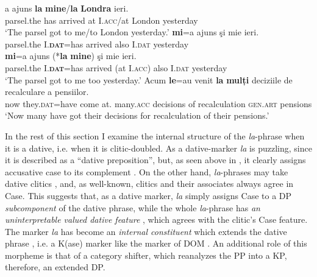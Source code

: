 \documentclass[output=paper,colorlinks,citecolor=brown,nonflat]{langsci/langscibook}
\begin{document}
\ea%
      \label{ex:cornilescu:11}
         \ea \label{ex:cornilescu:11a}
          {a} {ajuns} \textbf{{la}} \textbf{mine}/\textbf{la} \textbf{{Londra}} {ieri}.	\\
         	 parsel.the has arrived at I.\textsc{acc}/at London yesterday\\
         \glt ‘The parsel got to me/to London yesterday.’
         \ex \label{ex:cornilescu:11b}
          \textbf{{mi}}{=a} {ajuns} {şi} {mie} {ieri.}	\\
         	parsel.the I.\textbf{\textsc{dat}}=has arrived also I.\textsc{dat} yesterday\\
         \ex \label{ex:cornilescu:11c}
          \textbf{{mi}}{=a} {ajuns} (*\textbf{la} \textbf{mine}) {şi} {mie} {ieri}.	\\
         parsel.the I.\textbf{\textsc{dat}}=has arrived (at I.\textsc{acc}) also I.\textsc{dat} yesterday\\
         \glt ‘The parsel got to me too yesterday.’
         \ex \label{ex:cornilescu:11d}
         \gll Acum \textbf{{le}}{=au} {venit} \textbf{{la}} \textbf{{mulți}} {deciziile} {de} {recalculare} a pensiilor.\\
         	now they.\textsc{dat}=have come at. many.\textsc{acc} decisions of  recalculation \textsc{gen.art} pensions\\
         \glt ‘Now many have got their decisions for recalculation of their pensions.’
         \z
         \z

In the rest of this section I examine the internal structure of the \textit{la}{}-phrase when it is a dative, i.e. when it is clitic-doubled. As a dative-marker \textit{la} is puzzling, since it is described as a “dative preposition”, but, as seen above in , it clearly assigns accusative case to its complement . On the other hand, \textit{la}{}-phrases may take dative clitics , and, as well-known, clitics and their associates always agree in Case. This suggests that, as a dative marker, \textit{la} simply assigns Case to a DP \textit{subcomponent} of the dative phrase, while the whole \textit{la}{}-phrase has \textit{an uninterpretable valued dative feature} , which agrees with the clitic’s Case feature. The marker \textit{la} has become an \textit{internal constituent} which extends the dative phrase , i.e. a K(ase) marker like the marker of DOM \citep{López2012}. An additional role of this morpheme is that of a category shifter, which reanalyzes the PP into a KP, therefore, an extended DP.
\end{document}
